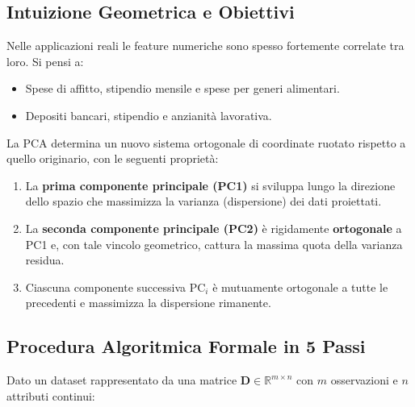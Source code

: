 \subsection{Intuizione Geometrica e Obiettivi}
Nelle applicazioni reali le feature numeriche sono spesso fortemente correlate tra loro. Si pensi a:
\begin{itemize}
    \item Spese di affitto, stipendio mensile e spese per generi alimentari.
    \item Depositi bancari, stipendio e anzianità lavorativa.
\end{itemize}
La PCA determina un nuovo sistema ortogonale di coordinate ruotato rispetto a quello originario, con le seguenti proprietà:
\begin{enumerate}
    \item La \textbf{prima componente principale (PC1)} si sviluppa lungo la direzione dello spazio che massimizza la varianza (dispersione) dei dati proiettati.
    \item La \textbf{seconda componente principale (PC2)} è rigidamente \textbf{ortogonale} a PC1 e, con tale vincolo geometrico, cattura la massima quota della varianza residua.
    \item Ciascuna componente successiva $\text{PC}_i$ è mutuamente ortogonale a tutte le precedenti e massimizza la dispersione rimanente.
\end{enumerate}

\subsection{Procedura Algoritmica Formale in 5 Passi}
Dato un dataset rappresentato da una matrice $\mathbf{D} \in \mathbb{R}^{m \times n}$ con $m$ osservazioni e $n$ attributi continui:

